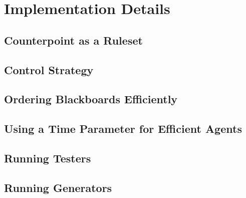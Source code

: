 \section{Implementation Details}

\subsection{Counterpoint as a Ruleset}

\subsection{Control Strategy}

\subsection{Ordering Blackboards Efficiently}

\subsection{Using a Time Parameter for Efficient Agents}

\subsection{Running Testers}

\subsection{Running Generators}
